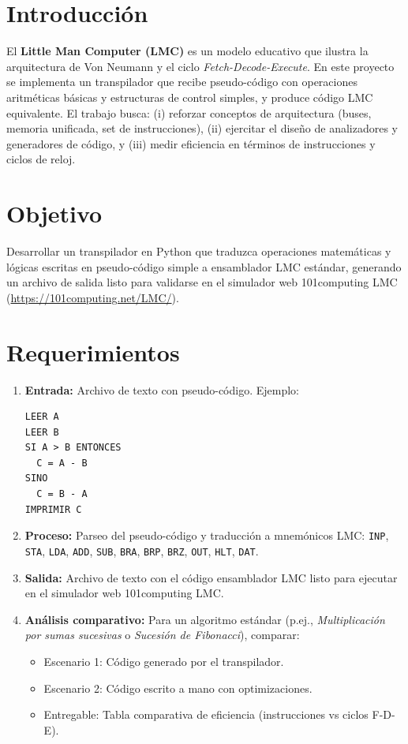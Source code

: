 \documentclass[12pt,a4paper]{article}
\begin{document}
\section{Introducción}
El \textbf{Little Man Computer (LMC)} es un modelo educativo que ilustra la arquitectura de Von Neumann y el ciclo \emph{Fetch-Decode-Execute}. En este proyecto se implementa un transpilador que recibe pseudo-código con operaciones aritméticas básicas y estructuras de control simples, y produce código LMC equivalente. El trabajo busca: (i) reforzar conceptos de arquitectura (buses, memoria unificada, set de instrucciones), (ii) ejercitar el diseño de analizadores y generadores de código, y (iii) medir eficiencia en términos de instrucciones y ciclos de reloj.

\section{Objetivo}
Desarrollar un transpilador en Python que traduzca operaciones matemáticas y lógicas escritas en pseudo-código simple a ensamblador LMC estándar, generando un archivo de salida listo para validarse en el simulador web 101computing LMC (\url{https://101computing.net/LMC/}).

\section{Requerimientos}
\begin{enumerate}[label=\textbf{\arabic*.}]
  \item \textbf{Entrada:} Archivo de texto con pseudo-código. Ejemplo:

\begin{lstlisting}[language=Pseudo,style=codeStyle,caption={Ejemplo de entrada en pseudo-código}]
LEER A
LEER B
SI A > B ENTONCES
  C = A - B
SINO
  C = B - A
IMPRIMIR C
\end{lstlisting}

  \item \textbf{Proceso:} Parseo del pseudo-código y traducción a mnemónicos LMC: \texttt{INP}, \texttt{STA}, \texttt{LDA}, \texttt{ADD}, \texttt{SUB}, \texttt{BRA}, \texttt{BRP}, \texttt{BRZ}, \texttt{OUT}, \texttt{HLT}, \texttt{DAT}.
  \item \textbf{Salida:} Archivo de texto con el código ensamblador LMC listo para ejecutar en el simulador web 101computing LMC.
  \item \textbf{Análisis comparativo:} Para un algoritmo estándar (p.ej., \emph{Multiplicación por sumas sucesivas} o \emph{Sucesión de Fibonacci}), comparar:
  \begin{itemize}
    \item Escenario 1: Código generado por el transpilador.
    \item Escenario 2: Código escrito a mano con optimizaciones.
    \item Entregable: Tabla comparativa de eficiencia (instrucciones vs ciclos F-D-E).
  \end{itemize}
\end{enumerate}
\end{document}
